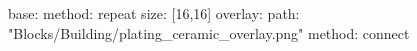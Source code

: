 base:
  method: repeat
  size: [16,16]
overlay:
  path: "Blocks/Building/plating_ceramic_overlay.png"
  method: connect